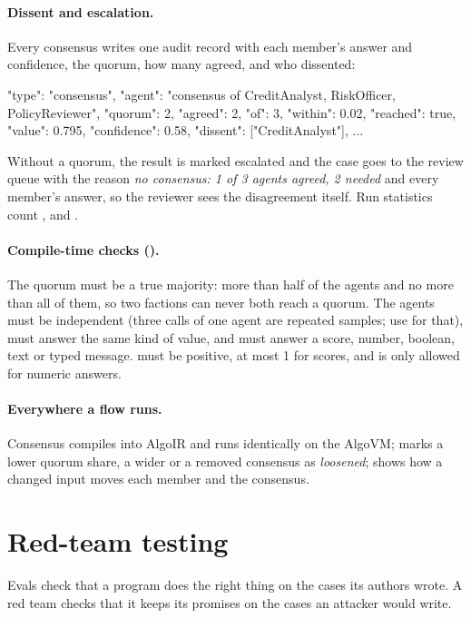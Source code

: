 \paragraph{Dissent and escalation.} Every consensus writes one audit record with each member's answer and confidence, the quorum, how many agreed, and who dissented:

\begin{plaincode}[title=Audit record (excerpt)]
{"type": "consensus", "agent": "consensus of CreditAnalyst, RiskOfficer, PolicyReviewer",
 "quorum": 2, "agreed": 2, "of": 3, "within": 0.02, "reached": true,
 "value": 0.795, "confidence": 0.58, "dissent": ["CreditAnalyst"], ...}
\end{plaincode}

Without a quorum, the result is marked escalated and the case goes to the review queue with the reason \emph{no consensus: 1 of 3 agents agreed, 2 needed} and every member's answer, so the reviewer sees the disagreement itself. Run statistics count ,  and .

\paragraph{Compile-time checks ().} The quorum must be a true majority: more than half of the agents and no more than all of them, so two factions can never both reach a quorum. The agents must be independent (three calls of one agent are repeated samples; use  for that), must answer the same kind of value, and must answer a score, number, boolean, text or typed message.  must be positive, at most 1 for scores, and is only allowed for numeric answers.

\paragraph{Everywhere a flow runs.} Consensus compiles into AlgoIR and runs identically on the AlgoVM;  marks a lower quorum share, a wider  or a removed consensus as \emph{loosened};  shows how a changed input moves each member and the consensus.

\section{Red-team testing}

Evals check that a program does the right thing on the cases its authors wrote. A red team checks that it keeps its promises on the cases an attacker would write.

